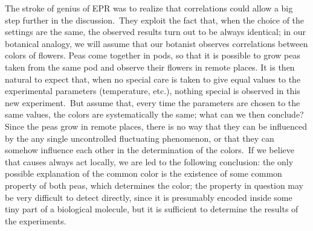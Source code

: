 \documentclass[12pt,onecolumn]{article}%
\begin{document}
The stroke of genius of EPR was to realize that correlations could allow a big
step further in the discussion.\ They exploit the fact that, when the choice
of the settings are the same, the observed results turn out to be always
identical; in our botanical analogy, we will assume that our botanist observes
correlations between colors of flowers. Peas come together in pods, so that it
is possible to grow peas taken from the same pod and observe their flowers in
remote places. It is then natural to expect that, when no special care is
taken to give equal values to the experimental parameters (temperature, etc.),
nothing special is observed in this new experiment.\ But assume that, every
time the parameters are chosen to the same values, the colors are
systematically the same; what can we then conclude? Since the peas grow in
remote places, there is no way that they can be influenced by the any single
uncontrolled fluctuating phenomenon, or that they can somehow influence each
other in the determination of the colors.\ If we believe that causes always
act locally, we are led to the following conclusion: the only possible
explanation of the common color is the existence of some common property of
both peas, which determines the color; the property in question may be very
difficult to detect directly, since it is presumably encoded inside some tiny
part of a biological molecule, but it is sufficient to determine the results
of the experiments.
\end{document}
